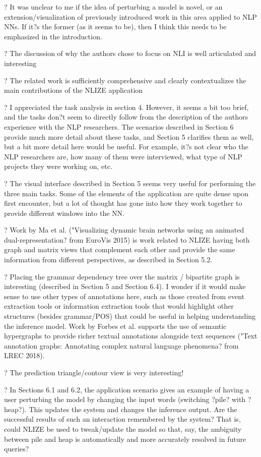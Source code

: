 ? It was unclear to me if the idea of perturbing a model is novel, or an extension/visualization of previously introduced work in this area applied to NLP NNs. If it?s the former (as it seems to be), then I think this needs to be emphasized in the introduction.

? The discussion of why the authors chose to focus on NLI is well articulated and interesting

? The related work is sufficiently comprehensive and clearly contextualizes the main contributions of the NLIZE application

? I appreciated the task analysis in section 4. However, it seems a bit too brief, and the tasks don?t seem to directly follow from the description of the authors experience with the NLP researchers. The scenarios described in Section 6 provide much more detail about these tasks, and Section 5 clarifies them as well, but a bit more detail here would be useful. For example, it?s not clear who the NLP researchers are, how many of them were interviewed, what type of NLP projects they were working on, etc.

? The visual interface described in Section 5 seems very useful for performing the three main tasks. Some of the elements of the application are quite dense upon first encounter, but a lot of thought has gone into how they work together to provide different windows into the NN.

? Work by Ma et al. ("Visualizing dynamic brain networks using an animated dual-representation? from EuroVis 2015) is work related to NLIZE having both graph and matrix views that complement each other and provide the same information from different perspectives, as described in Section 5.2.

? Placing the grammar dependency tree over the matrix / bipartite graph is interesting (described in Section 5 and Section 6.4). I wonder if it would make sense to use other types of annotations here, such as those created from event extraction tools or information extraction tools that would highlight other structures (besides grammar/POS) that could be useful in helping understanding the inference model. Work by Forbes et al. supports the use of semantic hypergraphs to provide richer textual annotations alongside text sequences ("Text annotation graphs: Annotating complex natural language phenomena? from LREC 2018).

? The prediction triangle/contour view is very interesting!

? In Sections 6.1 and 6.2, the application scenario gives an example of having a user perturbing the model by changing the input words (switching ?pile? with ?heap?). This updates the system and changes the inference output. Are the successful results of such an interaction remembered by the system? That is, could NLIZE be used to tweak/update the model so that, say, the ambiguity between pile and heap is automatically and more accurately resolved in future queries?

